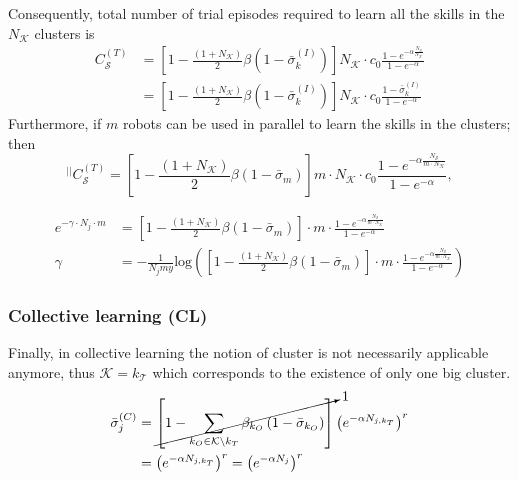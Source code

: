 Consequently, total number of trial episodes required to learn all the skills in the $ N_\mathcal{K} $ clusters is
\begin{align}\label{eq:complexity_transfer_single}
	C_\mathcal{S}^{(T)} &= \left[1 - \frac{\left(1+N_\mathcal{K}\right)}{2}\beta \left(1-\bar{\sigma}^{(I)}_k\right)\right] N_\mathcal{K} \cdot  c_0 \frac{1 - e^{-\alpha \frac{N_\mathcal{S}}{N_\mathcal{K}}}}{1 - e^{-\alpha}}\\
	&= \left[1 - \frac{\left(1+N_\mathcal{K}\right)}{2}\beta \left(1-\bar{\sigma}^{(I)}_k\right)\right] N_\mathcal{K} \cdot  c_0 \frac{1 - \bar{\sigma}^{(I)}_k}{1 - e^{-\alpha}}	
\end{align}
Furthermore, if $ m $ robots can be used in parallel to learn the skills in the clusters; then
\begin{equation}\label{eq:complexity_transfer_parallel}
	{}^{\lvert \lvert}C_\mathcal{S}^{(T)} = \left[1 - \frac{\left(1+N_\mathcal{K}\right)}{2}\beta \left(1-\bar{\sigma}_m\right)\right] m \cdot N_\mathcal{K}  \cdot c_0 \frac{1 - e^{-\alpha \frac{N_\mathcal{S}}{m \cdot N_\mathcal{K}}}}{1 - e^{-\alpha}},
\end{equation}

\begin{tcolorbox}
\begin{align}
	e^{-\gamma \cdot N_j \cdot m}  &= \left[1 - \frac{\left(1+N_\mathcal{K}\right)}{2}\beta \left(1-\bar{\sigma}_m\right)\right]  \cdot m \cdot \frac{1 - e^{-\alpha \frac{N_\mathcal{S}}{m \cdot N_\mathcal{K}}}}{1 - e^{-\alpha}}\\
	\gamma &= -\frac{1}{N_j my}\text{log} \left( \left[1 - \frac{\left(1+N_\mathcal{K}\right)}{2}\beta \left(1-\bar{\sigma}_m\right)\right]  \cdot m \cdot \frac{1 - e^{-\alpha \frac{N_\mathcal{S}}{m \cdot N_\mathcal{K}}}}{1 - e^{-\alpha}}\right)
\end{align}
\end{tcolorbox}
\subsubsection{\textbf{Collective learning (CL)}}
Finally, in collective learning the notion of cluster is not necessarily applicable anymore, thus 
$\mathcal{K} = k_\mathcal{T}$ which corresponds to the existence of only one big cluster.
\begin{align}
	\begin{split}
		\bar{\sigma}_j^{(C)} &=   \cancelto{1}{ \left[1- \sum_{k_O \in \mathcal{K} \setminus k_T}\beta_{k_O} \left( 1 - \bar{\sigma}_{k_O} \right)\right]} \left(e^{-\alpha {N_{j,k_T}}} \right)^r \\
		&= \left(e^{-\alpha N_{j,k_T}} \right)^r  = \left(e^{-\alpha N_{j}}\right)^r 
	\end{split}
\end{align}

